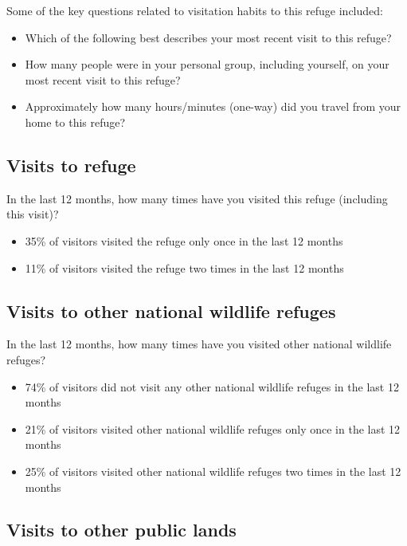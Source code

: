 \documentclass[]{book}
\providecommand{\tightlist}{%
  \setlength{\itemsep}{0pt}\setlength{\parskip}{0pt}}
\begin{document}
Some of the key questions related to visitation habits to this refuge
included:

\begin{itemize}
\tightlist
\item
  Which of the following best describes your most recent visit to this
  refuge?
\item
  How many people were in your personal group, including yourself, on
  your most recent visit to this refuge?
\item
  Approximately how many hours/minutes (one-way) did you travel from
  your home to this refuge?
\end{itemize}

\subsection{Visits to refuge}\label{visits-to-refuge}

In the last 12 months, how many times have you visited this refuge
(including this visit)?

\begin{itemize}
\tightlist
\item
  35\% of visitors visited the refuge only once in the last 12 months
\item
  11\% of visitors visited the refuge two times in the last 12 months
\end{itemize}

\subsection{Visits to other national wildlife
refuges}\label{visits-to-other-national-wildlife-refuges}

In the last 12 months, how many times have you visited other national
wildlife refuges?

\begin{itemize}
\tightlist
\item
  74\% of visitors did not visit any other national wildlife refuges in
  the last 12 months
\item
  21\% of visitors visited other national wildlife refuges only once in
  the last 12 months
\item
  25\% of visitors visited other national wildlife refuges two times in
  the last 12 months
\end{itemize}

\subsection{Visits to other public
lands}\label{visits-to-other-public-lands}
\end{document}
